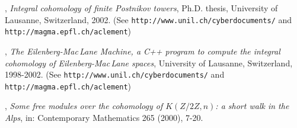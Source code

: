 \begin{thebibliography}{99}




, \textit{Integral cohomology of finite Postnikov towers}, Ph.D. thesis, University of Lausanne, Switzerland, 2002. (See {\tt http://www.unil.ch/cyberdocuments/} and {\tt http://magma.epfl.ch/aclement})

, \textit{The Eilenberg-Mac\,Lane Machine, a C++ program to compute the integral cohomology of Eilenberg-Mac\,Lane spaces}, University of Lausanne, Switzerland, 1998-2002. (See {\tt http://www.unil.ch/cyberdocuments/} and {\tt http://magma.epfl.ch/aclement})

, \textit{Some free modules over the cohomology of $K(Z/2Z,n)$: a short walk in the Alps}, in: Contemporary Mathematics 265 (2000), 7-20.








\end{thebibliography}
